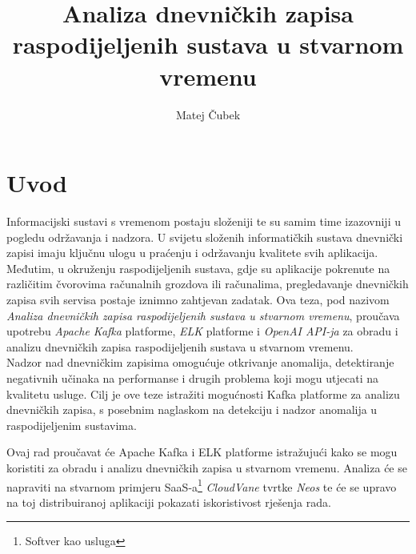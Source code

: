 \documentclass[times, utf8, diplomski]{fer}
\begin{document}

\title{Analiza dnevničkih zapisa raspodijeljenih sustava u stvarnom vremenu}

\author{Matej Čubek}

\maketitle

\zahvala{}

\renewcommand{\lstlistingname}{Isječak koda}%
\renewcommand{\lstlistlistingname}{Indeks isječka kodova}%




\begingroup
\renewcommand*\listfigurename{Indeks slika}
\renewcommand*\listtablename{Indeks tablica}

\listoffigures

\listoftables

\endgroup

\chapter{Uvod}

Informacijski sustavi s vremenom postaju složeniji te su samim time izazovniji u pogledu održavanja i nadzora. U svijetu složenih informatičkih sustava dnevnički zapisi imaju ključnu ulogu u praćenju i održavanju kvalitete svih aplikacija. Međutim, u okruženju raspodijeljenih sustava, gdje su aplikacije pokrenute na različitim čvorovima računalnih grozdova ili računalima, pregledavanje dnevničkih zapisa svih servisa postaje iznimno zahtjevan zadatak. Ova teza, pod nazivom \emph{\glqq Analiza dnevničkih zapisa raspodijeljenih sustava u stvarnom vremenu\grqq}, proučava upotrebu \emph{Apache Kafka} platforme, \emph{ELK} platforme i \emph{OpenAI API-ja} za obradu i analizu dnevničkih zapisa raspodijeljenih sustava u stvarnom vremenu.\\

Nadzor nad dnevničkim zapisima omogućuje otkrivanje anomalija, detektiranje negativnih učinaka na performanse i drugih problema koji mogu utjecati na kvalitetu usluge. Cilj je ove teze istražiti mogućnosti Kafka platforme za analizu dnevničkih zapisa, s posebnim naglaskom na detekciju i nadzor anomalija u raspodijeljenim sustavima.

Ovaj rad proučavat će Apache Kafka  i ELK platforme istražujući kako se mogu koristiti za obradu i analizu dnevničkih zapisa u stvarnom vremenu. Analiza će se napraviti na stvarnom primjeru SaaS-a\footnote{Softver kao usluga } \emph{CloudVane} tvrtke \emph{Neos} te će se upravo na toj distribuiranoj aplikaciji pokazati iskoristivost rješenja rada.
\end{document}
